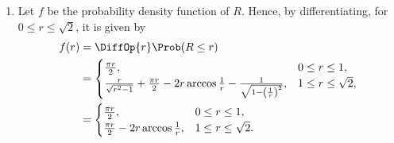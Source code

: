 \begin{enumerate}
    \item Let \(f\) be the probability density function of \(R\). Hence, by differentiating, for \(0 \leq r \leq \sqrt{2}\), it is given by
          \begin{align*}
              f(r) & = \DiffOp{r} \Prob(R \leq r)                                                                                                                       \\
                   & = \begin{cases}
                           \frac{\pi r}{2},                                                                                                       & 0 \leq r \leq 1,        \\
                           \frac{r}{\sqrt{r^2 - 1}} + \frac{\pi r}{2} - 2r \arccos \frac{1}{r} - \frac{1}{\sqrt{1 - \left(\frac{1}{r}\right)^2}}, & 1 \leq r \leq \sqrt{2},
                       \end{cases} \\
                   & = \begin{cases}
                           \frac{\pi r}{2},                           & 0 \leq r \leq 1,        \\
                           \frac{\pi r}{2} - 2 r \arccos \frac{1}{r}, & 1 \leq r \leq \sqrt{2}.
                       \end{cases}
          \end{align*}


\end{enumerate}
